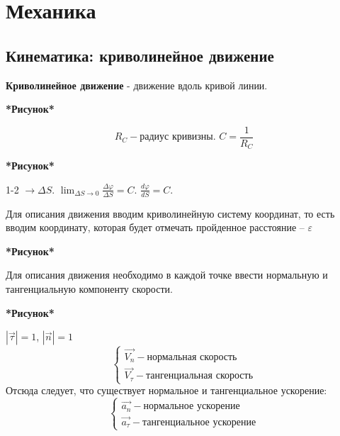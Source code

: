 \documentclass[a4paper,oneside]{article}
\theoremstyle{definition}
\newtheorem{definition}{Определение}[subsection]
\theoremstyle{definition}
\theoremstyle{definition}
\newcommand{\tbf}[1]{\textbf{#1}}
\newcommand{\dslim}{\displaystyle\lim}
\begin{document}
    




\section{Механика}
\subsection{Кинематика: криволинейное движение}
    \tbf{Криволинейное движение} - движение вдоль кривой линии.

\tbf{*Рисунок*}

\[R_C - \text{радиус кривизны. } C = \frac{1}{R_C}\]

\tbf{*Рисунок*}

1-2 $\rightarrow \Delta S$. $\dslim_{\Delta S \to 0} \frac{\Delta \varphi}{\Delta S} = C$. $\frac {d \varphi}{dS} = C$.

Для описания движения вводим криволинейную систему координат, то есть вводим координату, которая будет отмечать
пройденное расстояние -- $\varepsilon$

\tbf{*Рисунок*}

Для описания движения необходимо в каждой точке ввести нормальную и тангенциальную компоненту скорости.

\tbf{*Рисунок*}

$| \vec{\tau} | = 1$, $| \vec{n} | = 1$
\[
\begin{cases}
    \vec{V_n} - \text{нормальная скорость} \\
    \vec{V_\tau} - \text{тангенциальная скорость}
\end{cases}
\]    
Отсюда следует, что существует нормальное и тангенциальное ускорение:
\[
\begin{cases}
    \vec{a_n} - \text{нормальное ускорение} \\
    \vec{a_\tau} - \text{тангенциальное ускорение}
\end{cases}
\]
\end{document}
